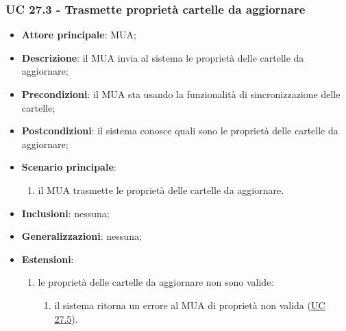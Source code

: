     \subsubsection{UC 27.3 - Trasmette proprietà cartelle da aggiornare} \label{sec:UC27.3}
    \begin{itemize}
        \item \textbf{Attore principale}: MUA;
        \item \textbf{Descrizione}: il MUA invia al sistema le proprietà delle cartelle da aggiornare;
        \item \textbf{Precondizioni}: il MUA sta usando la funzionalità di sincronizzazione delle cartelle;
        \item \textbf{Postcondizioni}: il sistema conosce quali sono le proprietà delle cartelle da aggiornare;
        \item \textbf{Scenario principale}:
            \begin{enumerate}
                \item il MUA trasmette le proprietà delle cartelle da aggiornare.
            \end{enumerate}
        \item \textbf{Inclusioni}: nessuna;
        \item \textbf{Generalizzazioni}: nessuna;
        \item \textbf{Estensioni}:
            \begin{enumerate}[label=\alph*.]
                \item le proprietà delle cartelle da aggiornare non sono valide:
                \begin{enumerate}[label=\arabic*.]
                    \item il sistema ritorna un errore al MUA di proprietà non valida (\hyperref[sec:UC27.5]{UC 27.5}).
                \end{enumerate}
            \end{enumerate}
    \end{itemize}


